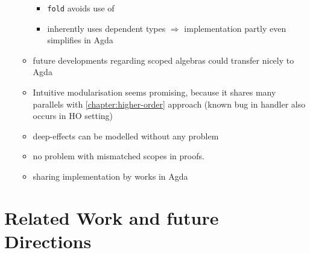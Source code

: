 \documentclass[10pt,a4paper,twoside]{report}
\begin{document}
\begin{itemize}
\begin{itemize}
    \begin{itemize}
      \item \texttt{fold} avoids use of 
      \item inherently uses dependent types $\Rightarrow{}$ implementation
        partly even simplifies in Agda
    \end{itemize}
    \item future developments regarding scoped algebras could transfer nicely to Agda
    \item Intuitive modularisation seems promising, because it shares many
      parallels with \ref{chapter:higher-order} approach (known bug in
       handler also occurs in HO setting)
    \item deep-effects can be modelled without any problem 
    \item no problem with mismatched scopes in proofs.
    \item sharing implementation by \textcite{bunkenburg2019modeling} works in Agda
  \end{itemize}
\end{itemize}


\section{Related Work and future Directions}
\end{document}
